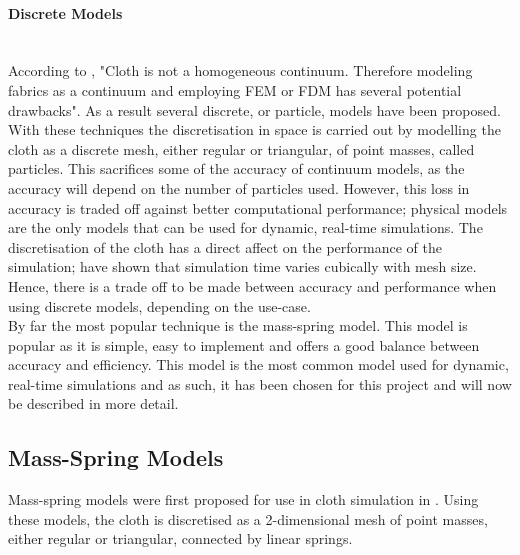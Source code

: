 \paragraph{Discrete Models}\leavevmode\\
According to \textcite[2]{Choi2002}, "Cloth is not a homogeneous continuum. Therefore modeling fabrics as a continuum and employing FEM or FDM has several potential drawbacks". As a result several discrete, or particle, models have been proposed.
\\With these techniques the discretisation in space is carried out by modelling the cloth as a discrete mesh, either regular or triangular, of point masses, called particles. This sacrifices some of the accuracy of continuum models, as the accuracy will depend on the number of particles used. However, this loss in accuracy is traded off against better computational performance; physical models are the only models that can be used for dynamic, real-time simulations. The discretisation of the cloth has a direct affect on the performance of the simulation; \textcite[5]{Volino2001} have shown that simulation time varies cubically with mesh size. Hence, there is a trade off to be made between accuracy and performance when using discrete models, depending on the use-case.
\\By far the most popular technique is the mass-spring model. This model is popular as it is simple, easy to implement and offers a good balance between accuracy and efficiency. This model is the most common model used for dynamic, real-time simulations and as such, it has been chosen for this project and will now be described in more detail.

\subsection{Mass-Spring Models}
Mass-spring models were first proposed for use in cloth simulation in \textcite{Provot2001}. Using these models, the cloth is discretised as a 2-dimensional mesh of point masses, either regular or triangular, connected by linear springs.

